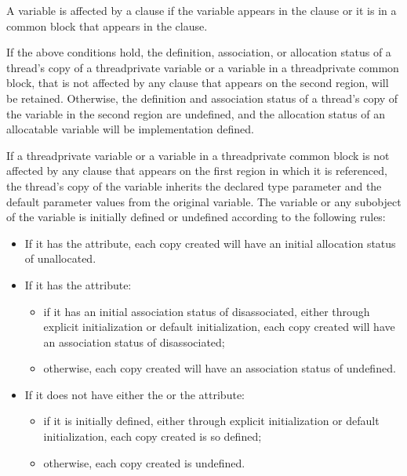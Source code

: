 \begin{fortranspecific}
A variable is affected by a  clause if the variable appears in the  clause
or it is in a common block that appears in the  clause.

If the above conditions hold, the definition, association, or allocation status of a thread's
copy of a threadprivate variable or a variable in a threadprivate common
block, that is not affected by any  clause that appears on the second region, will
be retained. Otherwise, the definition and association status of a thread's copy of the
variable in the second region are undefined, and the allocation status of an allocatable
variable will be implementation defined.

If a threadprivate variable or a variable in a threadprivate common block is
not affected by any  clause that appears on the first  region in which
it is referenced, the thread's copy of the variable inherits the
declared type parameter and the default parameter values from the
original variable.  The variable or any subobject of the variable is initially defined or
undefined according to the following rules:

\begin{itemize} %
\item If it has the  attribute, each copy created will have an initial
allocation status of unallocated.

\item If it has the  attribute:
\begin{itemize} %
\item if it has an initial association status of disassociated, either through explicit
initialization or default initialization, each copy created will have an association
status of disassociated;
\item otherwise, each copy created will have an association status of undefined.
\end{itemize} %

\item If it does not have either the  or the  attribute:

\begin{samepage}\begin{itemize} %
\item if it is initially defined, either through explicit initialization or default
initialization, each copy created is so defined;

\item otherwise, each copy created is undefined.
\end{itemize} %
\end{samepage}

\end{itemize} %
\end{fortranspecific}

